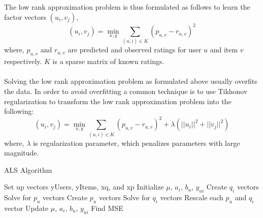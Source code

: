 \documentclass{sig-alternate-05-2015}
\begin{document}
The low rank approximation problem is thus formulated as follows to learn the factor vectors $(u_i, v_j)$,
\begin{equation*}
   (u_i, v_j) = \min_{x, y}\sum_{(u,i)\in K}^{} (p_{u,v}-r_{u,v})^2
\end{equation*}
where, $p_{u,v}$ and $r_{u,v}$ are predicted and observed ratings for user $u$ and item $v$ respectively. $K$ is a sparse matrix of known ratings.\\\\
Solving the low rank approximation problem as formulated above usually overfits the data. In order to avoid overfitting a common technique is to use Tikhonov regularization to transform the low rank approximation problem into the following:
\begin{equation*}
   (u_i, v_j) = \min_{x, y}\sum_{(u,i)\in K}^{} (p_{u,v}-r_{u,v})^2 + \lambda(||u_i||^2+||v_j||^2)
\end{equation*}
where, $\lambda$ is regularization parameter, which penalizes parameters with large magnitude.
\\
\begin{algorithm}
\caption{ALS Algorithm}
\label{CHalgorithm}
\begin{algorithmic}[1]
\State Set up vectors yUsers, yItems, xq, and xp
\State Initialize $\mu$, $a_i$, $b_u$, $y_{ui}$
\State Create $q_i$ vectors
\State    Solve for $p_u$ vectors 
\State Create $p_u$ vectors
\State    Solve for $q_i$ vectors
\State Rescale each $p_u$ and $q_i$ vector 
\State Update $\mu$, $a_i$, $b_u$, $y_{ui}$
\State Find MSE
\EndWhile
\end{algorithmic}
\end{algorithm}
\end{document}
